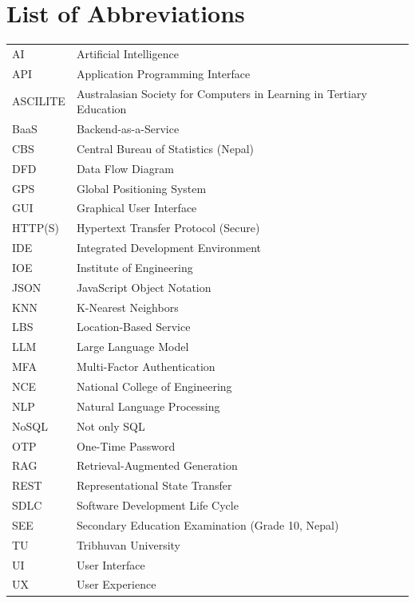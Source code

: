 \documentclass[12pt]{report}
\begin{document}


\tableofcontents
{}
\listoffigures
{}
\listoftables
\chapter*{List of Abbreviations}

\begin{tabular}{l l}
AI & Artificial Intelligence \\
API & Application Programming Interface \\
ASCI\-LITE & Australasian Society for Computers in Learning in Tertiary Education \\
BaaS & Backend-as-a-Service \\
CBS & Central Bureau of Statistics (Nepal) \\
DFD & Data Flow Diagram \\
GPS & Global Positioning System \\
GUI & Graphical User Interface \\
HTTP(S) & Hypertext Transfer Protocol (Secure) \\
IDE & Integrated Development Environment \\
IOE & Institute of Engineering \\
JSON & JavaScript Object Notation \\
KNN & K-Nearest Neighbors \\
LBS & Location-Based Service \\
LLM & Large Language Model \\
MFA & Multi-Factor Authentication \\
NCE & National College of Engineering \\
NLP & Natural Language Processing \\
NoSQL & Not only SQL \\
OTP & One-Time Password \\
RAG & Retrieval-Augmented Generation \\
REST & Representational State Transfer \\
SDLC & Software Development Life Cycle \\
SEE & Secondary Education Examination (Grade 10, Nepal) \\
TU & Tribhuvan University \\
UI & User Interface \\
UX & User Experience \\
\end{tabular}
\end{document}

